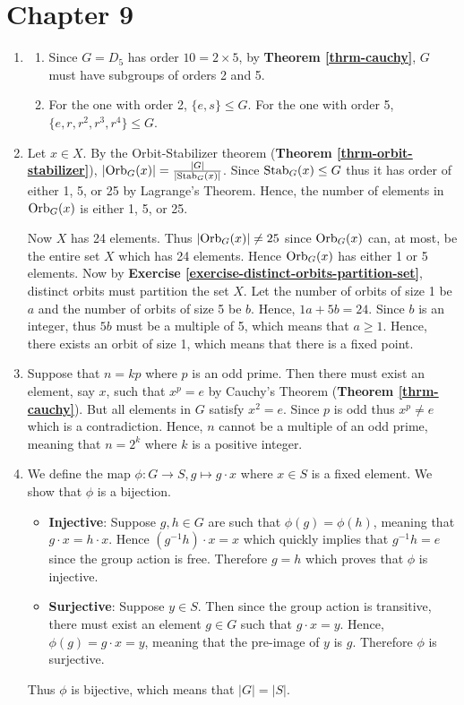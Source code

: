 \section*{Chapter 9}
\begin{enumerate}
    \item \begin{enumerate}[label=(\alph*)]
        \item Since $G = D_5$ has order $10 = 2 \times 5$, by \textbf{Theorem \ref{thrm-cauchy}}, $G$ must have subgroups of orders 2 and 5.
        \item For the one with order 2, $\{e, s\} \leq G$. For the one with order 5, $\{e, r, r^2, r^3, r^4\} \leq G$.
    \end{enumerate}

    \item Let $x \in X$. By the Orbit-Stabilizer theorem (\textbf{Theorem \ref{thrm-orbit-stabilizer}}), $|\mathrm{Orb}_{G}(x)| = \frac{|G|}{|\mathrm{Stab}_{G}(x)|}$. Since $\mathrm{Stab}_{G}(x) \leq G$ thus it has order of either 1, 5, or 25 by Lagrange's Theorem. Hence, the number of elements in $\mathrm{Orb}_{G}(x)$ is either 1, 5, or 25.

    Now $X$ has 24 elements. Thus $|\mathrm{Orb}_{G}(x)| \neq 25$ since $\mathrm{Orb}_{G}(x)$ can, at most, be the entire set $X$ which has 24 elements. Hence $\mathrm{Orb}_{G}(x)$ has either 1 or 5 elements. Now by \textbf{Exercise \ref{exercise-distinct-orbits-partition-set}}, distinct orbits must partition the set $X$. Let the number of orbits of size 1 be $a$ and the number of orbits of size 5 be $b$. Hence, $1a + 5b = 24$. Since $b$ is an integer, thus $5b$ must be a multiple of 5, which means that $a \geq 1$. Hence, there exists an orbit of size 1, which means that there is a fixed point.

    \item Suppose that $n = kp$ where $p$ is an odd prime. Then there must exist an element, say $x$, such that $x^p = e$ by Cauchy's Theorem (\textbf{Theorem \ref{thrm-cauchy}}). But all elements in $G$ satisfy $x^2 = e$. Since $p$ is odd thus $x^p \neq e$ which is a contradiction. Hence, $n$ cannot be a multiple of an odd prime, meaning that $n = 2^k$ where $k$ is a positive integer.

    \item We define the map $\phi: G \to S, g \mapsto g \cdot x$ where $x \in S$ is a fixed element. We show that $\phi$ is a bijection.
    \begin{itemize}
        \item \textbf{Injective}: Suppose $g, h \in G$ are such that $\phi(g) = \phi(h)$, meaning that $g\cdot x = h\cdot x$. Hence $(g^{-1}h) \cdot x = x$ which quickly implies that $g^{-1}h = e$ since the group action is free. Therefore $g = h$ which proves that $\phi$ is injective.
        \item \textbf{Surjective}: Suppose $y \in S$. Then since the group action is transitive, there must exist an element $g \in G$ such that $g \cdot x = y$. Hence, $\phi(g) = g\cdot x = y$, meaning that the pre-image of $y$ is $g$. Therefore $\phi$ is surjective.
    \end{itemize}
    Thus $\phi$ is bijective, which means that $|G| = |S|$.


\end{enumerate}
